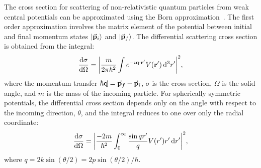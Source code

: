 \documentclass{project}
\begin{document}
The cross section for scattering of non-relativistic quantum particles from weak central potentials can be approximated
using the Born approximation~\cite{Born1926}. 
The first order approximation involves the matrix element of the potential between initial and final momentum states $\ket{\va{p}_i}$ and $\ket{\va{p}_f}$.
The differential scattering cross section is obtained from the integral:
\begin{equation} %
      \dv{\sigma}{\Omega} = \abs{ \frac{m}{2\pi\hbar^2} \int e^{-i\vb{q}\cdot \vb{r}'} V(\vb{r}') \dd[3]{r'} }^2,
\end{equation}
where the momentum transfer $\hbar\va{q} = \va{p}_f-\va{p}_i$, $\sigma$ is the cross section, $\Omega$ is the solid angle, and $m$ is the mass of the incoming particle.
For spherically symmetric potentials, the differential cross section depends only on the angle with respect to the incoming direction, $\theta$, and the integral reduces to one over only the radial coordinate: 
\begin{equation}
\dv{\sigma}{\Omega} =  \abs{\frac{-2m}{\hbar^2} \int_0^\infty \frac{\sin qr'}{q} V(r') r' \dd{r'}}^2,
\end{equation}
where $q = 2k \sin(\theta/2)= 2p \sin(\theta/2)/\hbar$.
\end{document}
